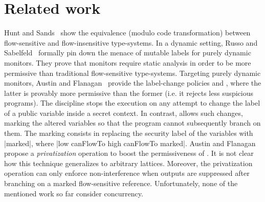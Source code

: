 \section{Related work}

Hunt and Sands~\citep{Hunt:2006} show the equivalence (modulo code
transformation) between flow-sensitive and flow-insensitive type-systems. In a
dynamic setting, Russo and Sabelfeld~\citep{Russo:2010} formally pin down the
menace of mutable labels for purely dynamic monitors. They prove that monitors
require static analysis in order to be more permissive than traditional
flow-sensitive type-systems. Targeting purely dynamic monitors, Austin and
Flanagan~\citep{Austin:Flanagan:PLAS10} provide the label-change policies
\emph{\nsu} and \emph{\pu}, where the latter is provably more permissive than the former
(i.e. it rejects less suspicious programs). The {\nsu} discipline stops the
execution on any attempt to change the label of a public variable inside a
secret context. In contrast, {\pu} allows such changes, marking the altered
variables so that the program cannot subsequently branch on them. The marking consists in replacing the
security label of the variables with |marked|, where |low canFlowTo high canFlowTo
marked|.  Austin and Flanagan propose a \emph{privatization} operation to boost
the permissiveness of {\pu}.  It is not clear how this technique generalizes to
arbitrary lattices. Moreover, the privatization operation can only enforce
non-interference when outputs are suppressed after branching on a marked
flow-sensitive reference. Unfortunately, none of the mentioned work so far
consider concurrency.


